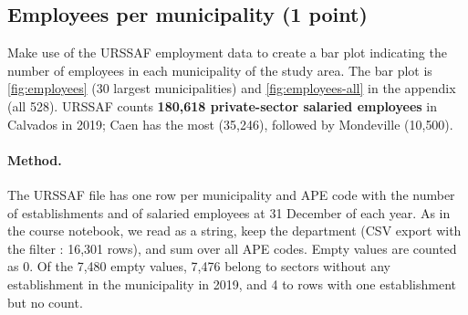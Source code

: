 \subsection{Employees per municipality (1 point)}

\begin{qa}{Make use of the URSSAF employment data to create a bar plot indicating the number of employees in each
municipality of the study area.}
The bar plot is \cref{fig:employees} (30 largest municipalities) and \cref{fig:employees-all} in the appendix
(all 528). URSSAF counts \textbf{180{,}618 private-sector salaried employees} in Calvados in 2019; Caen has the most
(35{,}246), followed by Mondeville (10{,}500).
\end{qa}

\paragraph{Method.}
The URSSAF file has one row per municipality and APE code with the number of establishments and of salaried employees
at 31 December of each year. As in the course notebook, we read  as a string, keep the department
(CSV export with the filter : 16{,}301 rows), and sum  over
all APE codes. Empty values are counted as 0. Of the 7{,}480 empty values, 7{,}476 belong to sectors without any
establishment in the municipality in 2019, and 4 to rows with one establishment but no count.

